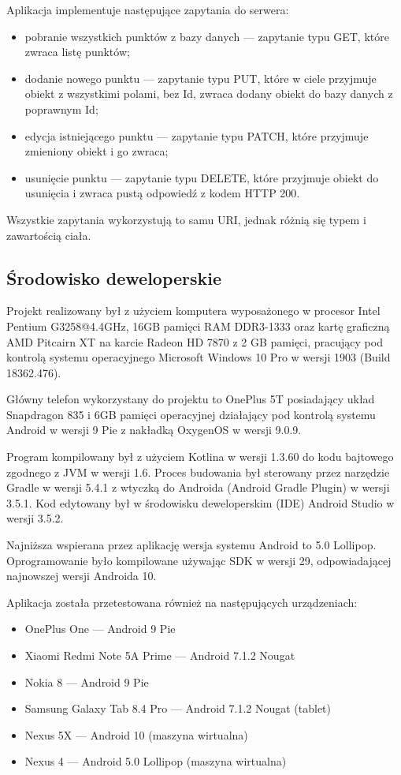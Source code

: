 \documentclass[polish,polish,a4paper,12pt]{article}
\begin{document}
	Aplikacja implementuje następujące zapytania do serwera:

	\begin{itemize}
		\item pobranie wszystkich punktów z bazy danych — zapytanie typu GET, które zwraca listę punktów;
		\item dodanie nowego punktu — zapytanie typu PUT, które w ciele przyjmuje obiekt z wszystkimi polami, bez Id, zwraca dodany obiekt do bazy danych z poprawnym Id;
		\item edycja istniejącego punktu — zapytanie typu PATCH, które przyjmuje zmieniony obiekt i go zwraca;
		\item usunięcie punktu — zapytanie typu DELETE, które przyjmuje obiekt do usunięcia i zwraca pustą odpowiedź z kodem HTTP 200.
	\end{itemize}

	Wszystkie zapytania wykorzystują to samu URI, jednak różnią się typem i zawartością ciała.

	\subsection{Środowisko deweloperskie}

	Projekt realizowany był z użyciem komputera wyposażonego w procesor Intel Pentium G3258@4.4GHz, 16GB pamięci RAM DDR3-1333 oraz kartę graficzną AMD Pitcairn XT na karcie Radeon HD 7870 z 2 GB pamięci, pracujący pod kontrolą systemu operacyjnego Microsoft Windows 10 Pro w wersji 1903 (Build 18362.476).

	Główny telefon wykorzystany do projektu to OnePlus 5T posiadający układ Snapdragon 835 i 6GB pamięci operacyjnej działający pod kontrolą systemu Android w wersji 9 Pie z nakładką OxygenOS w wersji 9.0.9.

	Program kompilowany był z użyciem Kotlina w wersji 1.3.60 do kodu bajtowego zgodnego z JVM w wersji 1.6. Proces budowania był sterowany przez narzędzie Gradle w wersji 5.4.1 z wtyczką do Androida (Android Gradle Plugin) w wersji 3.5.1. Kod edytowany był w środowisku deweloperskim (IDE) Android Studio w wersji 3.5.2.

	Najniższa wspierana przez aplikację wersja systemu Android to 5.0 Lollipop. Oprogramowanie było kompilowane używając SDK w wersji 29, odpowiadającej najnowszej wersji Androida 10.

	Aplikacja została przetestowana również na następujących urządzeniach:

	\begin{itemize}
		\item OnePlus One — Android 9 Pie
		\item Xiaomi Redmi Note 5A Prime — Android 7.1.2 Nougat
		\item Nokia 8 — Android 9 Pie
		\item Samsung Galaxy Tab 8.4 Pro — Android 7.1.2 Nougat (tablet)
		\item Nexus 5X — Android 10 (maszyna wirtualna)
		\item Nexus 4 — Android 5.0 Lollipop (maszyna wirtualna)
	\end{itemize}
\end{document}
